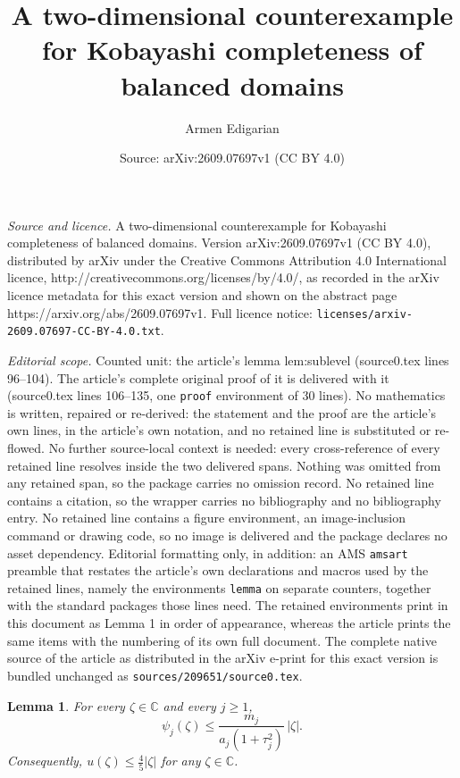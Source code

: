 \documentclass[10pt,a4paper]{amsart}
\title{A two-dimensional counterexample for Kobayashi completeness of balanced domains}
\author{Armen Edigarian}
\date{Source: arXiv:2609.07697v1 (CC BY 4.0)}
\newtheorem{lemma}{Lemma}
\begin{document}
\maketitle

\noindent\emph{Source and licence.} A two-dimensional counterexample for Kobayashi completeness of balanced domains. Version arXiv:2609.07697v1 (CC BY 4.0), distributed by arXiv under the Creative Commons Attribution 4.0 International licence, http://creativecommons.org/licenses/by/4.0/, as recorded in the arXiv licence metadata for this exact version and shown on the abstract page https://arxiv.org/abs/2609.07697v1. Full licence notice: \texttt{licenses/arxiv-2609.07697-CC-BY-4.0.txt}.\par\smallskip

\noindent\textit{Editorial scope.} Counted unit: the article's lemma lem:sublevel (source0.tex lines 96--104). The article's complete original proof of it is delivered with it (source0.tex lines 106--135, one \texttt{proof} environment of 30 lines). No mathematics is written, repaired or re-derived: the statement and the proof are the article's own lines, in the article's own notation, and no retained line is substituted or re-flowed.  No further source-local context is needed: every cross-reference of every retained line resolves inside the two delivered spans.  Nothing was omitted from any retained span, so the package carries no omission record.  No retained line contains a citation, so the wrapper carries no bibliography and no bibliography entry.  No retained line contains a figure environment, an image-inclusion command or drawing code, so no image is delivered and the package declares no asset dependency.  Editorial formatting only, in addition: an AMS \texttt{amsart} preamble that restates the article's own declarations and macros used by the retained lines, namely the environments \texttt{lemma} on separate counters, together with the standard packages those lines need.  The retained environments print in this document as Lemma 1 in order of appearance, whereas the article prints the same items with the numbering of its own full document.  The complete native source of the article as distributed in the arXiv e-print for this exact version is bundled unchanged as \texttt{sources/209651/source0.tex}.
\begin{lemma}\label{lem:sublevel}
For every $\zeta\in\mathbb C$ and every $j\ge1$,
\[
 \psi_j(\zeta)\le
 \frac{m_j}{a_j(1+\tau_j^2)}\,|\zeta|.
\]
Consequently,
$u(\zeta)\le \frac45|\zeta|$ for any $\zeta\in\mathbb C$.
\end{lemma}
\end{document}
